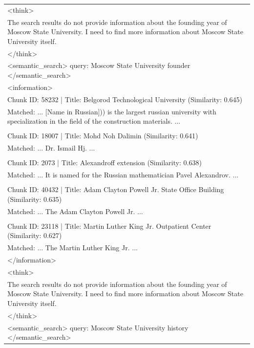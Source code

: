 \documentclass[11pt]{article}
\begin{document}
\begin{longtable}{|p{}|}
\textless{}think\textgreater{} \\
The search results do not provide information about the founding year of Moscow State University. I need to find more information about Moscow State University itself. \\
\textless{}/think\textgreater{} \\
\textless{}semantic\_search\textgreater{} query: Moscow State University founder \textless{}/semantic\_search\textgreater{} \\
\hline

\textless{}information\textgreater{} \\
Chunk ID: 58232 | Title: Belgorod Technological University (Similarity: 0.645) \\
Matched: ... [Name in Russian])) is the largest russian university with specialization in the field of the construction materials. ... \\
\\
Chunk ID: 18007 | Title: Mohd Noh Dalimin (Similarity: 0.641) \\
Matched: ... Dr. Ismail Hj. ... \\
\\
Chunk ID: 2073 | Title: Alexandroff extension (Similarity: 0.638) \\
Matched: ... It is named for the Russian mathematician Pavel Alexandrov. ... \\
\\
Chunk ID: 40432 | Title: Adam Clayton Powell Jr. State Office Building (Similarity: 0.635) \\
Matched: ... The Adam Clayton Powell Jr. ... \\
\\
Chunk ID: 23118 | Title: Martin Luther King Jr. Outpatient Center (Similarity: 0.627) \\
Matched: ... The Martin Luther King Jr. ... \\
\textless{}/information\textgreater{} \\
\hline

\textless{}think\textgreater{} \\
The search results do not provide information about the founding year of Moscow State University. I need to find more information about Moscow State University itself. \\
\textless{}/think\textgreater{} \\
\textless{}semantic\_search\textgreater{} query: Moscow State University history \textless{}/semantic\_search\textgreater{} \\
\hline


\end{longtable}
\end{document}
